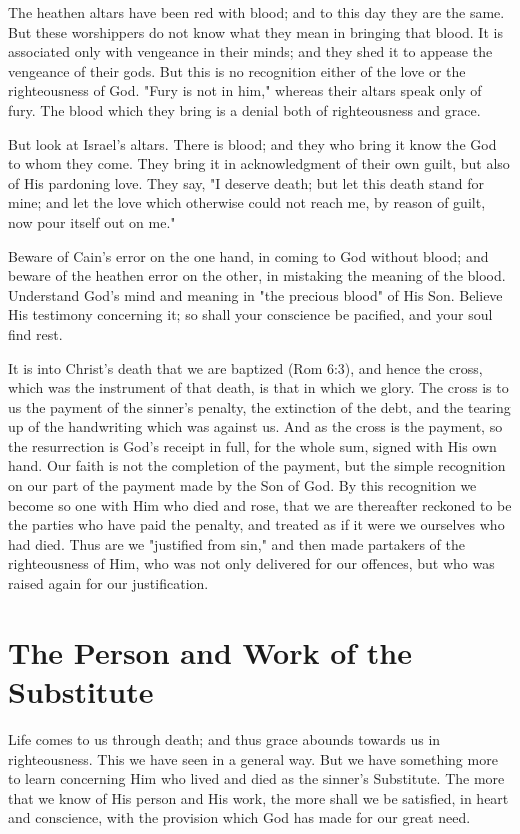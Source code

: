 \documentclass[
]{book}
\begin{document}
The heathen altars have been red with blood; and to this day they are the same. But these worshippers do not know what they mean in bringing that blood. It is associated only with vengeance in their minds; and they shed it to appease the vengeance of their gods. But this is no recognition either of the love or the righteousness of God. "Fury is not in him," whereas their altars speak only of fury. The blood which they bring is a denial both of righteousness and grace.

But look at Israel's altars. There is blood; and they who bring it know the God to whom they come. They bring it in acknowledgment of their own guilt, but also of His pardoning love. They say, "I deserve death; but let this death stand for mine; and let the love which otherwise could not reach me, by reason of guilt, now pour itself out on me."

Beware of Cain's error on the one hand, in coming to God without blood; and beware of the heathen error on the other, in mistaking the meaning of the blood. Understand God's mind and meaning in "the precious blood" of His Son. Believe His testimony concerning it; so shall your conscience be pacified, and your soul find rest.

It is into Christ's death that we are baptized (Rom 6:3), and hence the cross, which was the instrument of that death, is that in which we glory. The cross is to us the payment of the sinner's penalty, the extinction of the debt, and the tearing up of the handwriting which was against us. And as the cross is the payment, so the resurrection is God's receipt in full, for the whole sum, signed with His own hand. Our faith is not the completion of the payment, but the simple recognition on our part of the payment made by the Son of God. By this recognition we become so one with Him who died and rose, that we are thereafter reckoned to be the parties who have paid the penalty, and treated as if it were we ourselves who had died. Thus are we "justified from sin," and then made partakers of the righteousness of Him, who was not only delivered for our offences, but who was raised again for our justification.

\hypertarget{the-person-and-work-of-the-substitute}{%
\chapter{The Person and Work of the Substitute}\label{the-person-and-work-of-the-substitute}}

Life comes to us through death; and thus grace abounds towards us in righteousness. This we have seen in a general way. But we have something more to learn concerning Him who lived and died as the sinner's Substitute. The more that we know of His person and His work, the more shall we be satisfied, in heart and conscience, with the provision which God has made for our great need.
\end{document}
